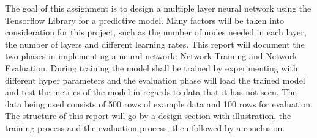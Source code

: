 
The goal of this assignment is to design a multiple layer neural network using the Tensorflow Library for a predictive model. Many factors will be taken into consideration for this project, such as the number of nodes needed in each layer, the number of layers and different learning rates. This report will document the two phases in implementing a neural network: Network Training and Network Evaluation. During training the model shall be trained by experimenting with different hyper parameters and the evaluation phase will load the trained model and test the metrics of the model in regards to data that it has not seen. The data being used consists of 500 rows of example data and 100 rows for evaluation. \\ The structure of this report will go by a design section with illustration, the training process and the evaluation process, then followed by a conclusion.
